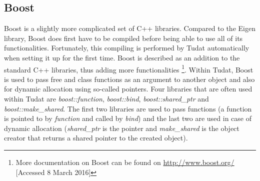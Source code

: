 \subsection{Boost}
\label{subsec:boost}
Boost is a slightly more complicated set of C++ libraries. Compared to the Eigen library, Boost does first have to be compiled before being able to use all of its functionalities. Fortunately, this compiling is performed by \ac{Tudat} automatically when setting it up for the first time. Boost is described as an addition to the standard C++ libraries, thus adding more functionalities \citep{dirkx2016tudat} \footnote{More documentation on Boost can be found on \url{http://www.boost.org/} [Accessed 8 March 2016]}. Within \ac{Tudat}, Boost is used to pass free and class functions as an argument to another object and also for dynamic allocation using so-called pointers. Four libraries that are often used within \ac{Tudat} are \textit{boost::function}, \textit{boost::bind}, \textit{boost::shared\_ptr} and \textit{boost::make\_shared}. The first two libraries are used to pass functions (a function is pointed to by \textit{function} and called by \textit{bind}) and the last two are used in case of dynamic allocation (\textit{shared\_ptr} is the pointer and \textit{make\_shared} is the object creator that returns a shared pointer to the created object). 

